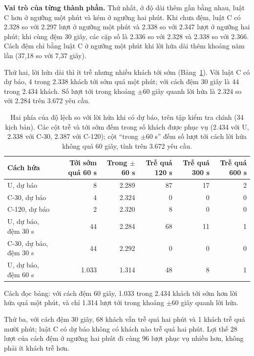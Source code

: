 \textbf{Vai trò của từng thành phần.} Thứ nhất, ở độ dài thêm gần bằng nhau, luật C hơn ở ngưỡng một phút và kém ở
ngưỡng hai phút. Khi chưa đệm, luật C có 2.328 so với 2.297 lượt ở ngưỡng một phút và 2.338 so với 2.347 lượt ở ngưỡng
hai phút; khi cùng đệm 30 giây, các cặp số là 2.336 so với 2.328 và 2.338 so với 2.366. Cách đệm chỉ bằng luật C ở
ngưỡng một phút khi lời hứa dài thêm khoảng năm lần (37,18 so với 7,37 giây).

Thứ hai, lời hứa dài thì ít trễ nhưng nhiều khách tới sớm (Bảng~\ref{bang:c4-haiphia}). Với luật C có dự báo, 4
trong 2.338 khách tới sớm quá một phút; với cách đệm 30 giây là 44 trong 2.434 khách. Số lượt tới trong khoảng
$\pm$60 giây quanh lời hứa là 2.324 so với 2.284 trên 3.672 yêu cầu.

\begin{table}[htbp]
\centering
\caption{Hai phía của độ lệch so với lời hứa khi có dự báo, trên tập kiểm tra chính (34 kịch bản). Các cột trễ và
tới sớm đếm trong số khách được phục vụ (2.434 với U, 2.338 với C-30, 2.387 với C-120); cột ``trong $\pm$60 s''
đếm số lượt tới cách lời hứa không quá 60 giây, tính trên 3.672 yêu cầu.}
\label{bang:c4-haiphia}
\small
\begin{tabular}{@{}p{4.4cm}rrrrr@{}}
\toprule
\textbf{Cách hứa} & \textbf{Tới sớm quá 60 s} & \textbf{Trong $\pm$60 s} & \textbf{Trễ quá 120 s} &
\textbf{Trễ quá 300 s} & \textbf{Trễ quá 600 s}\\
\midrule
U, dự báo & 8 & 2.289 & 87 & 17 & 2\\
C-30, dự báo & 4 & 2.324 & 0 & 0 & 0\\
C-120, dự báo & 2 & 2.320 & 8 & 0 & 0\\
U, dự báo, đệm 30 s & 44 & 2.284 & 68 & 11 & 1\\
C-30, dự báo, đệm 30 s & 44 & 2.292 & 0 & 0 & 0\\
U, dự báo, đệm 60 s & 1.033 & 1.314 & 48 & 8 & 1\\
\bottomrule
\end{tabular}
\end{table}

Cách đọc bảng: với cách đệm 60 giây, 1.033 trong 2.434 khách tới sớm hơn lời hứa quá một phút, và chỉ 1.314 lượt tới
trong khoảng $\pm$60 giây quanh lời hứa.

Thứ ba, với cách đệm 30 giây, 68 khách vẫn trễ quá hai phút và 1 khách trễ quá mười phút; luật C có dự báo không có
khách nào trễ quá hai phút. Lợi thế 28 lượt của cách đệm ở ngưỡng hai phút đi cùng 96 lượt phục vụ nhiều hơn, không
phải ít khách trễ hơn.

